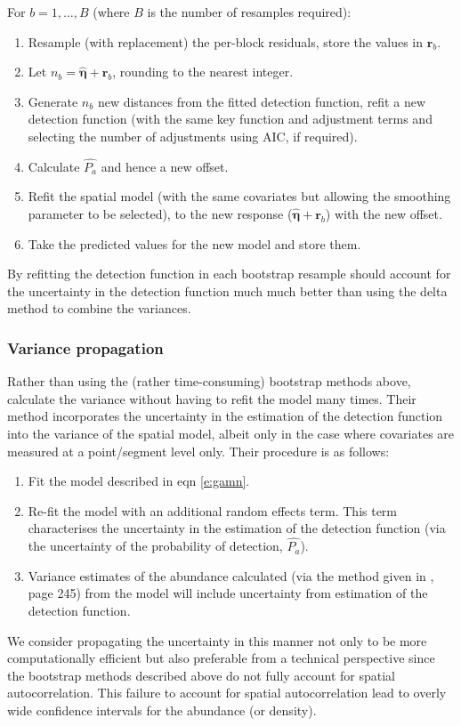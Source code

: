 \documentclass[a4paper,12pt]{article}
\begin{document}
For $b=1,\ldots,B$ (where $B$ is the number of resamples required):
\begin{enumerate}
	\item Resample (with replacement) the per-block residuals, store the values in $\mathbf{r}_{b}$.
	\item Let $n_b=\hat{\bm{\eta}}+\mathbf{r}_{b}$, rounding to the nearest integer.
	\item Generate $n_b$ new distances from the fitted detection function, refit a new detection function (with the same key function and adjustment terms and selecting the number of adjustments using AIC, if required).
	\item Calculate $\hat{P_a}$ and hence a new offset.
	\item Refit the spatial model (with the same covariates but allowing the smoothing parameter to be selected), to the new response ($\hat{\bm{\eta}}+\mathbf{r}_{b}$) with the new offset.
	\item Take the predicted values for the new model and store them.
\end{enumerate}

By refitting the detection function in each bootstrap resample should account for the uncertainty in the detection function much much better than using the delta method to combine the variances.

\subsubsection*{Variance propagation}

Rather than using the (rather time-consuming) bootstrap methods above, \cite{WILLIAMS:2011in} calculate the variance without having to refit the model many times.  Their method incorporates the uncertainty in the estimation of the detection function into the variance of the spatial model, albeit only in the case where covariates are measured at a point/segment level only. Their procedure is as follows:
\begin{enumerate}
\item Fit the model described in eqn \ref{e:gamn}.
\item Re-fit the model with an additional random effects term. This term characterises the uncertainty in the estimation of the detection function (via the uncertainty of the probability of detection, $\hat{P_a}$).
\item Variance estimates of the abundance calculated (via the method given in \cite{Wood:2006wz}, page 245) from the model will include uncertainty from estimation of the detection function.
\end{enumerate}
We consider propagating the uncertainty in this manner not only to be more computationally efficient but also preferable from a technical perspective since the bootstrap methods described above do not fully account for spatial autocorrelation. This failure to account for spatial autocorrelation lead to overly wide confidence intervals for the abundance (or density).
\end{document}
